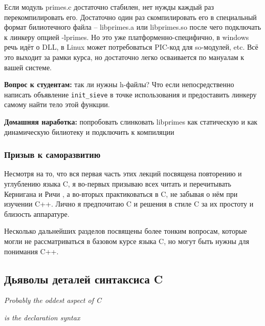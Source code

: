 \documentclass[a4paper,12pt,oneside]{article}
\newif\ifanswers
\begin{document}
Если модуль primes.c достаточно стабилен, нет нужды каждый раз перекомпилировать его. Достаточно один раз скомпилировать его в специальный формат билиотечного файла -- libprimes.a или libprimes.so после чего подключать к линкеру опцией -lprimes. Но это уже платформенно-специфично, в windows речь идёт о DLL, в Linux может потребоваться PIC-код для so-модулей, etc. Всё это выходит за рамки курса, но достаточно легко осваивается по мануалам к вашей системе.

\textbf{Вопрос к студентам:} так ли нужны h-файлы? Что если непосредственно написать объявление \lstinline!init_sieve! в точке использования и предоставить линкеру самому найти тело этой функции.

\ifanswers
Правильный ответ: формально да, так можно сделать. Но реально единые заголовочники помогают бороться с человеческими ошибками. Когда изменяются типы параметров в точке определения, компилятор подскажет несоответствие заголовочнику и все места где их надо изменить в точке использования. Если же заголовочника не будет а программист забудет это сделать, будет тихое UB
\fi

\textbf{Домашняя наработка:} попробовать слинковать libprimes как статическую и как динамическую билиотеку и подключить к компиляции

\subsubsection{Призыв к саморазвитию}

Несмотря на то, что вся первая часть этих лекций посвящена повторению и углублению языка C, я во-первых призываю всех читать и перечитывать Кернигана и Ричи \cite{ritchie}, а во-вторых практиковаться в C, не забывая о нём при изучении C++. Лично я предпочитаю C и решения в стиле C за их простоту и близость аппаратуре.

Несколько дальнейших разделов посвящены более тонким вопросам, которые могли не рассматриваться в базовом курсе языка C, но могут быть нужны для понимания C++.

\pagebreak
\subsection{Дьяволы деталей синтаксиса C}\label{DevilDetails}

\hfill\textit{Probably the oddest aspect of C}

\hfill\textit{is the declaration syntax}{\vspace{0.5em}}
\end{document}
